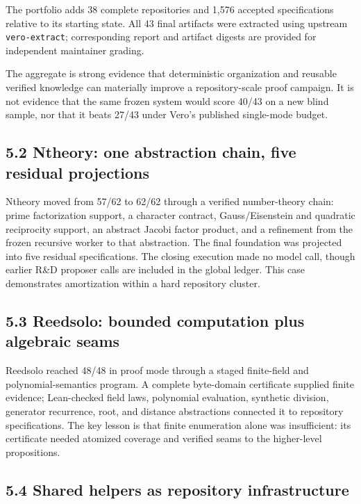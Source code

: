 \documentclass[
  10pt,
]{article}
\begin{document}
The portfolio adds 38 complete repositories and 1,576 accepted
specifications relative to its starting state. All 43 final artifacts
were extracted using upstream \texttt{vero-extract}; corresponding
report and artifact digests are provided for independent maintainer
grading.

The aggregate is strong evidence that deterministic organization and
reusable verified knowledge can materially improve a repository-scale
proof campaign. It is not evidence that the same frozen system would
score 40/43 on a new blind sample, nor that it beats 27/43 under Vero's
published single-mode budget.

\subsection{5.2 Ntheory: one abstraction chain, five residual
projections}\label{ntheory-one-abstraction-chain-five-residual-projections}

Ntheory moved from 57/62 to 62/62 through a verified number-theory
chain: prime factorization support, a character contract,
Gauss/Eisenstein and quadratic reciprocity support, an abstract Jacobi
factor product, and a refinement from the frozen recursive worker to
that abstraction. The final foundation was projected into five residual
specifications. The closing execution made no model call, though earlier
R\&D proposer calls are included in the global ledger. This case
demonstrates amortization within a hard repository cluster.

\subsection{5.3 Reedsolo: bounded computation plus algebraic
seams}\label{reedsolo-bounded-computation-plus-algebraic-seams}

Reedsolo reached 48/48 in proof mode through a staged finite-field and
polynomial-semantics program. A complete byte-domain certificate
supplied finite evidence; Lean-checked field laws, polynomial
evaluation, synthetic division, generator recurrence, root, and distance
abstractions connected it to repository specifications. The key lesson
is that finite enumeration alone was insufficient: its certificate
needed atomized coverage and verified seams to the higher-level
propositions.

\subsection{5.4 Shared helpers as repository
infrastructure}\label{shared-helpers-as-repository-infrastructure}
\end{document}
